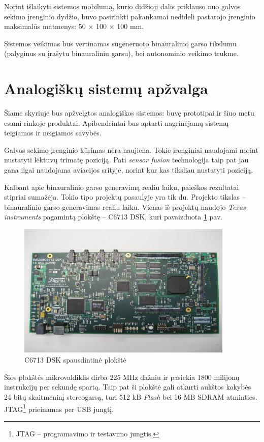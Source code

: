 \documentclass[]{vgtuef}
\begin{document}
Norint išlaikyti sistemos mobilumą, kurio didžioji dalis priklauso nuo galvos sekimo įrenginio dydžio, buvo pasirinkti pakankamai nedideli pastarojo įrenginio maksimalūs matmenys: 50 $\times$ 100 $\times$ 100 mm.

Sistemos veikimas bus vertinamas sugeneruoto binauralinio garso tikslumu (palyginus su įrašytu binauraliniu garsu), bei autonominio veikimo trukme.


\section{Analogiškų sistemų apžvalga}

Šiame skyriuje bus apžvelgtos analogiškos sistemos: buvę prototipai ir šiuo metu esami rinkoje produktai. Apibendrintai bus aptarti nagrinėjamų sistemų teigiamos ir neigiamos savybės. 


Galvos sekimo įrenginio kūrimas nėra naujiena. Tokie įrenginiai naudojami norint nustatyti lėktuvų  trimatę poziciją. Pati \textit{sensor fusion} technologija taip pat jau gana ilgai naudojama aviacijos srityje, norint kur kas tiksliau nustatyti poziciją.

Kalbant apie binauralinio garso generavimą realiu laiku, paieškos rezultatai stipriai sumažėja. Tokio tipo projektų pasaulyje yra tik du. Projekto tikslas – binauralinio garso generavimas realiu laiku. Vienas iš projektų naudojo \textit{Texas instruments} pagamintą plokštę -- C6713 DSK, kuri pavaizduota \ref{fig:C6713_dsk_board} pav.

\begin{figure}[!ht]
  \centering
  \includegraphics[width=390px]{img/c6713.jpg}
  \caption{C6713 DSK spausdintinė plokštė}
  \label{fig:C6713_dsk_board}
\end{figure}

Šios plokštės mikrovaldiklis dirba 225 MHz dažniu ir pasiekia 1800 milijonų instrukcijų per sekundę spartą. Taip pat ši plokštė gali atkurti aukštos kokybės 24 bitų skaitmeninį stereogarsą, turi 512 kB \textit{Flash} bei 16 MB SDRAM atminties. JTAG\footnote{JTAG -- programavimo ir testavimo jungtis.} prieinamas per USB jungtį.
\end{document}
